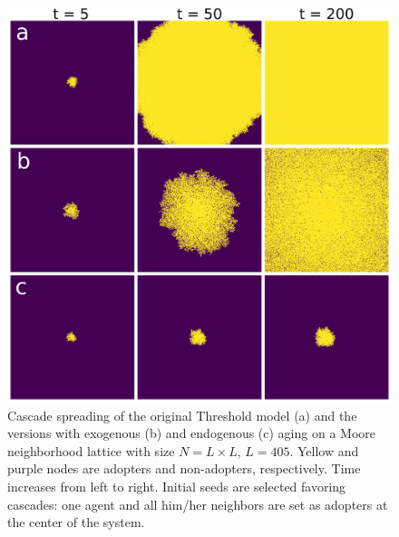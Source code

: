 \begin{figure}
\includegraphics[width=\columnwidth]{Figs/Aging_Threshold/LATT_PLOT.png}
\caption{\label{fig:evo_lat} Cascade spreading of the original Threshold model (a) and the versions with exogenous (b) and endogenous (c) aging on a Moore neighborhood lattice with size $N = L \times L$, $L = 405$. Yellow and purple nodes are adopters and non-adopters, respectively. Time increases from left to right. Initial seeds are selected favoring cascades: one agent and all him/her neighbors are set as adopters at the center of the system.}
\end{figure}


